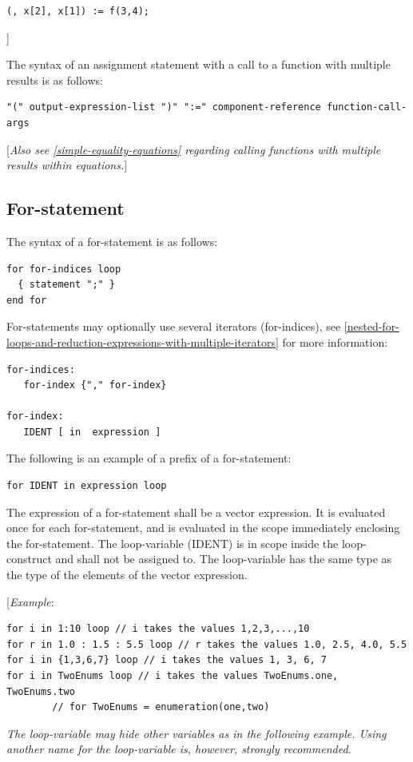 \documentclass[10pt,a4paper]{report}
\def\doublelabel#1{\label{#1}\hypertarget{#1}{}}
\begin{document}
\begin{lstlisting}[language=modelica]
  (, x[2], x[1]) := f(3,4);
\end{lstlisting}
{]}

The syntax of an assignment statement with a call to a function with
multiple results is as follows:
\begin{lstlisting}[language=grammar]
"(" output-expression-list ")" ":=" component-reference function-call-args
\end{lstlisting}

{[}\emph{Also see \ref{simple-equality-equations} regarding calling functions with
multiple results within equations.}{]}

\subsection{For-statement}\doublelabel{for-statement}

The syntax of a for-statement is as follows:

\begin{lstlisting}[language=grammar]
for for-indices loop
  { statement ";" }
end for
\end{lstlisting}
For-statements may optionally use several iterators (for-indices), see
\ref{nested-for-loops-and-reduction-expressions-with-multiple-iterators} for more information:

\begin{lstlisting}[language=grammar]
for-indices:
   for-index {"," for-index}

for-index:
   IDENT [ in  expression ]
\end{lstlisting}
The following is an example of a prefix of a for-statement:

\begin{lstlisting}[language=modelica]
for IDENT in expression loop
\end{lstlisting}
The expression of a for-statement shall be a vector expression. It is
evaluated once for each for-statement, and is evaluated in the scope
immediately enclosing the for-statement. The loop-variable (IDENT) is in
scope inside the loop-construct and shall not be assigned to. The
loop-variable has the same type as the type of the elements of the
vector expression.

{[}\emph{Example}:

\begin{lstlisting}[language=modelica]
for i in 1:10 loop // i takes the values 1,2,3,...,10
for r in 1.0 : 1.5 : 5.5 loop // r takes the values 1.0, 2.5, 4.0, 5.5
for i in {1,3,6,7} loop // i takes the values 1, 3, 6, 7
for i in TwoEnums loop // i takes the values TwoEnums.one, TwoEnums.two
        // for TwoEnums = enumeration(one,two)
\end{lstlisting}
\emph{The loop-variable may hide other variables as in the following
example. Using another name for the loop-variable is, however, strongly
recommended.}
\end{document}
